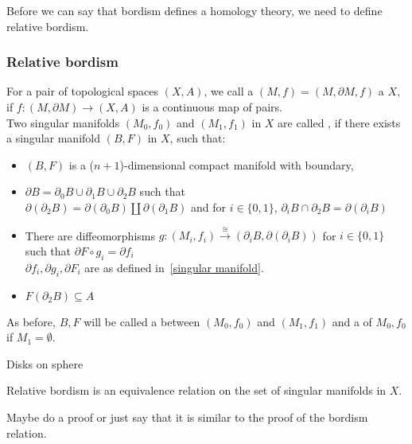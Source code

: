 \documentclass[a4paper,11pt]{article}
\begin{document}
Before we can say that bordism defines a homology theory, we need to define relative bordism.

\subsubsection{Relative bordism}

\begin{definition}
    For a pair of topological spaces \((X,A)\), we call a \((M,f)=(M,\partial M,f)\) a \(X\), if \(f:(M,\partial M)\to (X,A)\) is a continuous map of pairs.\\
    Two singular manifolds \((M_0,f_0)\) and \((M_1,f_1)\) in \(X\) are called , if there exists a singular manifold \((B,F)\) in \(X\), such that:
    \begin{itemize}
        \item \((B,F)\) is a (\(n+1\))-dimensional compact manifold with boundary,
        \item \(\partial B=\partial_0B\cup\partial_1B\cup\partial_2B\) such that \\
                \(\partial(\partial_2B)=\partial(\partial_0B)\amalg\partial(\partial_1B)\) and
                for \(i\in\{0,1\}\), \(\partial_i B\cap\partial_2B=\partial(\partial_i B)\)
        \item There are diffeomorphisms \(g:(M_i,f_i)\xrightarrow{\cong}(\partial_{i} B,\partial(\partial_{i}B))\) for \(i\in\{0,1\}\) such that \(\partial F\circ g_i=\partial f_i\)\\
        \(\partial f_i, \partial g_i, \partial F_i\) are as defined in\ \ref{singular manifold}.
        \item \(F(\partial_2B)\subseteq A\)
    \end{itemize}
    As before, \(B,F\) will be called a  between \((M_0,f_0)\) and \((M_1,f_1)\) and a  of \(M_0,f_0\) if \(M_1=\emptyset\).
\end{definition}

\begin{example}
    Disks on sphere
\end{example}

\begin{theorem}\cite[p.525]{dieck}
    Relative bordism is an equivalence relation on the set of singular manifolds in \(X\).
\end{theorem}

Maybe do a proof or just say that it is similar to the proof of the bordism relation.
\end{document}
